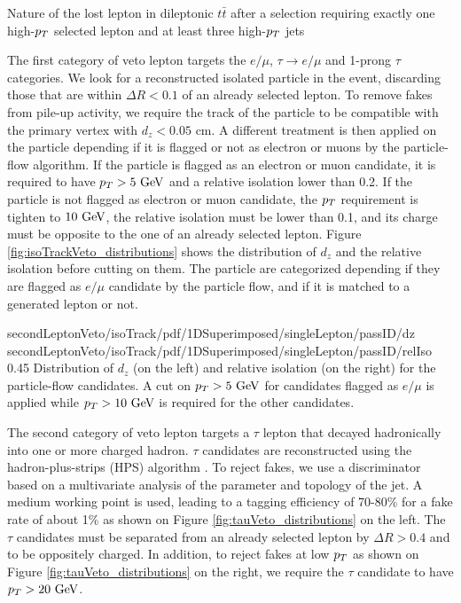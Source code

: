                  {Nature of the lost lepton in dileptonic $t\bar{t}$ after a selection 
                 requiring exactly one high-$p_T$ selected lepton and at least three 
                 high-$p_T$ jets}

    The first category of veto lepton targets the $e/\mu$, $\tau \rightarrow e/\mu$ and
    1-prong $\tau$ categories. We look for a reconstructed isolated particle in the event, 
    discarding those that are within $\Delta R < 0.1$ of an already selected lepton. To 
    remove fakes from pile-up activity, we require the track of the particle to be 
    compatible with the primary vertex with $d_z < 0.05$ cm. A different treatment is then
    applied on the particle depending if it is flagged or not as electron or muons by the
    particle-flow algorithm. If the particle is flagged as an electron or muon candidate,  
    it is required to have $p_T > 5~\text{GeV}$ and a relative isolation lower than 0.2. 
    If the particle is not flagged as electron or muon candidate, the $p_T$ requirement 
    is tighten to $10~\text{GeV}$, the relative isolation must be lower than 0.1, and its charge 
    must be opposite to the one of an already selected lepton. 
    Figure \ref{fig:isoTrackVeto_distributions} shows the distribution of $d_z$ and the
    relative isolation before cutting on them. The particle are categorized depending if
    they are flagged as $e/\mu$ candidate by the particle flow, and if it is matched to a 
    generated lepton or not.

                     {secondLeptonVeto/isoTrack/pdf/1DSuperimposed/singleLepton/passID/dz}
                     {secondLeptonVeto/isoTrack/pdf/1DSuperimposed/singleLepton/passID/relIso}
                     {0.45}
                     {Distribution of $d_z$ (on the left) and relative isolation (on the right)
                     for the particle-flow candidates. A cut on $p_T > 5~\text{GeV}$ for candidates 
                     flagged as $e/\mu$ is applied while $p_T > 10~\text{GeV}$ is required for 
                     the other candidates.}

    The second category of veto lepton targets a $\tau$ lepton that decayed hadronically 
    into one or more charged hadron. $\tau$ candidates are reconstructed using the 
    hadron-plus-strips (HPS) algorithm . To reject fakes, we use a discriminator 
    based on a multivariate analysis of the parameter and topology of the jet. A medium
    working point is used, leading to a tagging efficiency of 70-80\% for a fake rate of
    about 1\% as shown on Figure \ref{fig:tauVeto_distributions} on the left. The $\tau$
    candidates must be separated from an already selected lepton by $\Delta R > 0.4$ and
    to be oppositely charged. In addition, to reject fakes at low $p_T$ as shown on Figure 
    \ref{fig:tauVeto_distributions} on the right, we require the $\tau$ candidate to have 
    $p_T > 20~\text{GeV}$.

